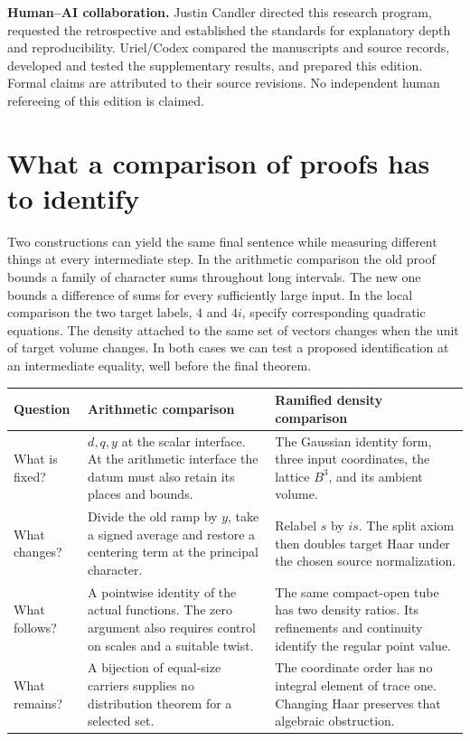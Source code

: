 \documentclass[12pt,letterpaper]{article}
\begin{document}
\medskip\textbf{Human--AI collaboration.} Justin Candler directed this research program, requested the retrospective and established the standards for explanatory depth and reproducibility. Uriel/Codex compared the manuscripts and source records, developed and tested the supplementary results, and prepared this edition. Formal claims are attributed to their source revisions. No independent human refereeing of this edition is claimed.
\clearpage\begingroup\small\setlength{\parskip}{0pt}\def\addvspace#1{\vskip4pt}\tableofcontents\endgroup
\clearpage{}
\section{What a comparison of proofs has to identify}
Two constructions can yield the same final sentence while measuring different things at every intermediate step. In the arithmetic comparison the old proof bounds a family of character sums throughout long intervals. The new one bounds a difference of sums for every sufficiently large input. In the local comparison the two target labels, $4$ and $4i$, specify corresponding quadratic equations. The density attached to the same set of vectors changes when the unit of target volume changes. In both cases we can test a proposed identification at an intermediate equality, well before the final theorem.

\begin{center}\small\begin{tabularx}{\linewidth}{@{}p{.16\linewidth}YY@{}}\toprule
Question & Arithmetic comparison & Ramified density comparison\\\midrule
What is fixed? & $d,q,y$ at the scalar interface. At the arithmetic interface the datum must also retain its places and bounds. & The Gaussian identity form, three input coordinates, the lattice $B^3$, and its ambient volume.\\
What changes? & Divide the old ramp by $y$, take a signed average and restore a centering term at the principal character. & Relabel $s$ by $is$. The split axiom then doubles target Haar under the chosen source normalization.\\
What follows? & A pointwise identity of the actual functions. The zero argument also requires control on scales and a suitable twist. & The same compact-open tube has two density ratios. Its refinements and continuity identify the regular point value.\\
What remains? & A bijection of equal-size carriers supplies no distribution theorem for a selected set. & The coordinate order has no integral element of trace one. Changing Haar preserves that algebraic obstruction.\\\bottomrule\end{tabularx}\end{center}
\end{document}
